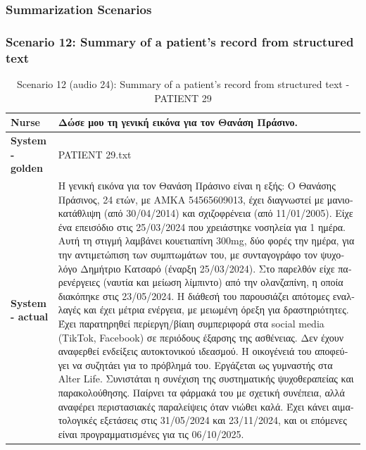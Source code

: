 \subsubsection{Summarization Scenarios}
\subsubsection{Scenario 12: Summary of a patient's record from structured text}
\begin{table}[H]
\centering
\renewcommand{\arraystretch}{1.5} 
\begin{tabular}{|>{\bfseries}l|p{11cm}|}
\hline
Nurse & \textgreek{Δώσε μου τη γενική εικόνα για τον Θανάση Πράσινο.} \\
\hline
System - golden & PATIENT 29.txt \\
\hline
System - actual & \textgreek{Η γενική εικόνα για τον Θανάση Πράσινο είναι η εξής: Ο Θανάσης Πράσινος, 24 ετών, με ΑΜΚΑ 54565609013, έχει διαγνωστεί με μανιοκατάθλιψη (από 30/04/2014) και σχιζοφρένεια (από 11/01/2005). Είχε ένα επεισόδιο στις 25/03/2024 που χρειάστηκε νοσηλεία για 1 ημέρα.
Αυτή τη στιγμή λαμβάνει κουετιαπίνη 300mg, δύο φορές την ημέρα, για την αντιμετώπιση των συμπτωμάτων του, με συνταγογράφο τον ψυχολόγο Δημήτριο Κατσαρό (έναρξη 25/03/2024). Στο παρελθόν είχε παρενέργειες (ναυτία και μείωση λίμπιντο) από την ολανζαπίνη, η οποία διακόπηκε στις 23/05/2024.
Η διάθεσή του παρουσιάζει απότομες εναλλαγές και έχει μέτρια ενέργεια, με μειωμένη όρεξη για δραστηριότητες. Έχει παρατηρηθεί περίεργη/βίαιη συμπεριφορά στα} social media (TikTok, Facebook) \textgreek{σε περιόδους έξαρσης της ασθένειας. Δεν έχουν αναφερθεί ενδείξεις αυτοκτονικού ιδεασμού.
Η οικογένειά του αποφεύγει να συζητάει για το πρόβλημά του. Εργάζεται ως γυμναστής στα} Alter Life.
\textgreek{Συνιστάται η συνέχιση της συστηματικής ψυχοθεραπείας και παρακολούθησης. Παίρνει τα φάρμακά του με σχετική συνέπεια, αλλά αναφέρει περιστασιακές παραλείψεις όταν νιώθει καλά. Έχει κάνει αιματολογικές εξετάσεις στις 31/05/2024 και 23/11/2024, και οι επόμενες είναι προγραμματισμένες για τις 06/10/2025.} \\
\hline
\end{tabular}
\caption{Scenario 12 (audio 24): Summary of a patient's record from structured text - PATIENT 29}
\end{table}

